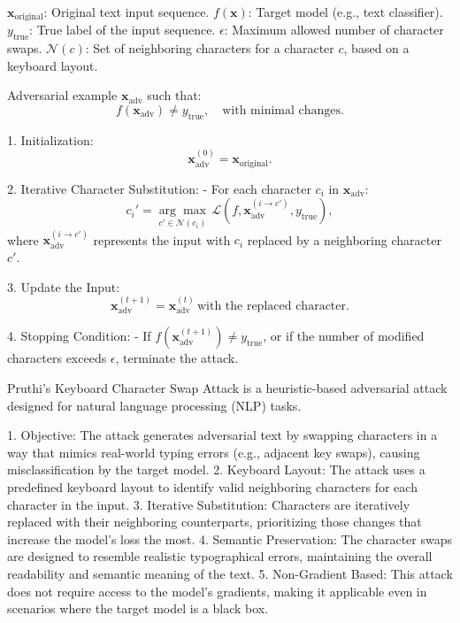 $\mathbf{x}_{\text{original}}$: Original text input sequence.
$f(\mathbf{x})$: Target model (e.g., text classifier).
$y_{\text{true}}$: True label of the input sequence.
$\epsilon$: Maximum allowed number of character swaps.
$\mathcal{N}(c)$: Set of neighboring characters for a character $c$, based on a keyboard layout.

Adversarial example $\mathbf{x}_{\text{adv}}$ such that:
\[
f(\mathbf{x}_{\text{adv}}) \neq y_{\text{true}}, \quad \text{with minimal changes}.
\]

1. Initialization:
   \[
   \mathbf{x}_{\text{adv}}^{(0)} = \mathbf{x}_{\text{original}}.
   \]

2. Iterative Character Substitution:
   - For each character $c_i$ in $\mathbf{x}_{\text{adv}}$:
     \[
     c_i' = \underset{c' \in \mathcal{N}(c_i)}{\arg \max} \, \mathcal{L}(f, \mathbf{x}_{\text{adv}}^{(i \rightarrow c')}, y_{\text{true}}),
     \]
     where $\mathbf{x}_{\text{adv}}^{(i \rightarrow c')}$ represents the input with $c_i$ replaced by a neighboring character $c'$.

3. Update the Input:
   \[
   \mathbf{x}_{\text{adv}}^{(t+1)} = \mathbf{x}_{\text{adv}}^{(t)} \, \text{with the replaced character}.
   \]

4. Stopping Condition:
   - If $f(\mathbf{x}_{\text{adv}}^{(t+1)}) \neq y_{\text{true}}$, or if the number of modified characters exceeds $\epsilon$, terminate the attack.

Pruthi's Keyboard Character Swap Attack is a heuristic-based adversarial attack designed for natural language processing (NLP) tasks.

1. Objective: The attack generates adversarial text by swapping characters in a way that mimics real-world typing errors (e.g., adjacent key swaps), causing misclassification by the target model.
2. Keyboard Layout: The attack uses a predefined keyboard layout to identify valid neighboring characters for each character in the input.
3. Iterative Substitution: Characters are iteratively replaced with their neighboring counterparts, prioritizing those changes that increase the model's loss the most.
4. Semantic Preservation: The character swaps are designed to resemble realistic typographical errors, maintaining the overall readability and semantic meaning of the text.
5. Non-Gradient Based: This attack does not require access to the model's gradients, making it applicable even in scenarios where the target model is a black box.